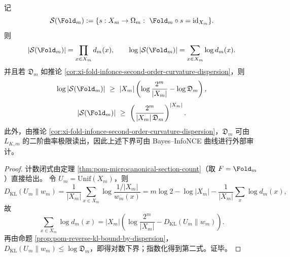 \begin{proposition}[右逆空间的指数下界与二阶曲率可审计证书]\label{prop:xi-fold-right-inverse-count-dispersion-lowerbound}
记
\[
\mathcal S(\Fold_m):=\{s:X_m\to\Omega_m:\ \Fold_m\circ s=\mathrm{id}_{X_m}\}.
\]
则
\[
|\mathcal S(\Fold_m)|=\prod_{x\in X_m} d_m(x),
\qquad
\log |\mathcal S(\Fold_m)|=\sum_{x\in X_m}\log d_m(x).
\]
并且若 \(\mathfrak D_m\) 如推论 \ref{cor:xi-fold-infonce-second-order-curvature-dispersion}，则
\[
\log |\mathcal S(\Fold_m)|
\ \ge\
|X_m|\left(\log\frac{2^m}{|X_m|}-\log\mathfrak D_m\right),
\]
\[
|\mathcal S(\Fold_m)|
\ \ge\
\left(\frac{2^m}{|X_m|\,\mathfrak D_m}\right)^{|X_m|}.
\]
此外，由推论 \ref{cor:xi-fold-infonce-second-order-curvature-dispersion}，\(\mathfrak D_m\) 可由 \(L_{K,m}\) 的二阶曲率极限读出，因此上述下界可由 Bayes--InfoNCE 曲线进行外部审计。
\end{proposition}
\begin{proof}
计数闭式由定理 \ref{thm:pom-microcanonical-section-count}（取 \(F=\Fold_m\)）直接给出。
令 \(U_m=\mathrm{Unif}(X_m)\)，则
\[
D_{\mathrm{KL}}(U_m\|w_m)
=\frac1{|X_m|}\sum_{x\in X_m}\log\frac{1/|X_m|}{w_m(x)}
=m\log2-\log|X_m|-\frac{1}{|X_m|}\sum_x\log d_m(x),
\]
故
\[
\sum_{x\in X_m}\log d_m(x)
=|X_m|\left(\log\frac{2^m}{|X_m|}-D_{\mathrm{KL}}(U_m\|w_m)\right).
\]
再由命题 \ref{prop:pom-reverse-kl-bound-by-dispersion}，
\(
D_{\mathrm{KL}}(U_m\|w_m)\le \log\mathfrak D_m
\)，即得对数下界；指数化得到第二式。证毕。
\end{proof}

\endinput
